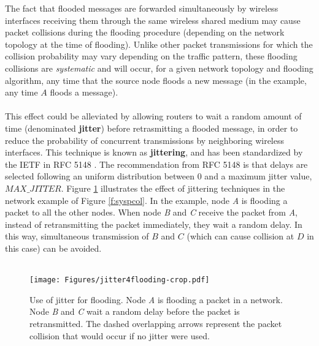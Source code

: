 The fact that flooded messages are forwarded simultaneously by wireless interfaces receiving them through the same wireless shared medium may cause packet collisions during the flooding procedure (depending on the network topology at the time of flooding). Unlike other packet transmissions for which the collision probability may vary depending on the traffic pattern, these flooding collisions are {\em systematic} and will occur, for a given network topology and flooding algorithm, any time that the source node floods a new message (in the example, any time $A$ floods a message). \ \\ \ \\
%
This effect could be alleviated by allowing routers to wait a random amount of time (denominated {\bf jitter}) before retrasmitting a flooded message, in order to reduce the probability of concurrent transmissions by neighboring wireless interfaces. This technique is known as {\bf jittering}, and has been standardized by the IETF in RFC 5148 \cite{rfc5148}. The recommendation from RFC 5148 is that delays are selected following an uniform distribution between $0$ and a maximum jitter value, $MAX\_JITTER$. Figure \ref{f:jitter} illustrates the effect of jittering techniques in the network example of Figure \ref{f:syspcol}. In the example, node \textit{A} is flooding a packet to all the other nodes. When node \textit{B} and \textit{C} receive the packet from \textit{A}, instead of retransmitting the packet immediately, they wait a random delay. In this way, simultaneous transmission of $B$ and $C$ (which can cause collision at $D$ in this case) can be avoided. \ \\ \ \\
%
\begin{figure}[htb]
\centering
\texttt{[image: Figures/jitter4flooding-crop.pdf]}
\caption{Use of jitter for flooding. Node \textit{A} is flooding a packet in a network. Node \textit{B} and \textit{C} wait a random delay before the packet is retransmitted. The dashed overlapping arrows represent the packet collision that would occur if no jitter were used.}
\label{f:jitter}
\end{figure}
%
